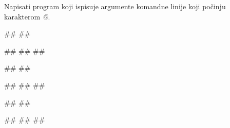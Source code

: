 \begin{Exercise}[label=p2.6_02] 
Napisati program koji ispisuje argumente komandne linije koji počinju karakterom \textit{@}.

\begin{minitest}
\begin{upotreba}{1}
#\naslovPokretanje#
##

#\naslovIzlaz#
##
##
\end{upotreba}
\end{minitest}
\begin{minitest}
\begin{upotreba}{2}
#\naslovPokretanje#
##

#\naslovIzlaz#
##
##
\end{upotreba}
\end{minitest}
\begin{minitest}
\begin{upotreba}{3}
#\naslovPokretanje#
##

#\naslovIzlaz#
##
##
\end{upotreba}
\end{minitest}

\end{Exercise}
\ifresenja
\begin{Answer}[ref=p2.6_02]
\end{Answer}
 \fi


